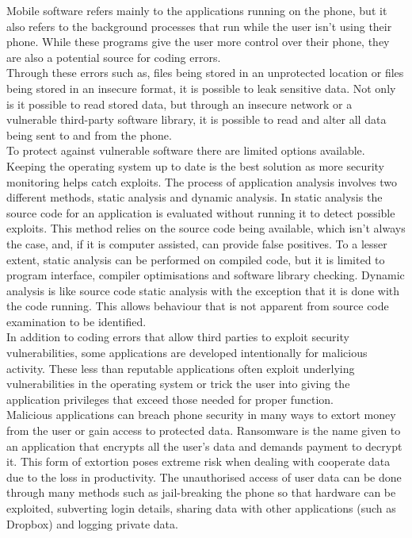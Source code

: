 Mobile software refers mainly to the applications running on the phone, but it  also refers to the background processes that run while the user isn't using their phone.
While these programs give the user more control over their phone, they are also a potential source for coding errors.\\ 
Through these errors such as, files being stored in an unprotected location or files being stored in an insecure format, it is possible to leak sensitive data.\cite{Reference14}
Not only is it possible to read stored data, but through an insecure network or a vulnerable third-party software library, it is possible to read and alter all data being sent to and from the phone.\\ 
To protect against vulnerable software there are limited options available.
Keeping the operating system up to date is the best solution as more security monitoring helps catch exploits.\cite{Reference12}
The process of application analysis involves two different methods, static analysis and dynamic analysis.
In static analysis the source code for an application is evaluated without running it to detect possible exploits.
This method relies on the source code being available, which isn’t always the case, and, if it is computer assisted, can provide false positives.\cite{Reference15}
To a lesser extent, static analysis can be performed on compiled code, but it is limited to program interface, compiler optimisations and software library checking.
Dynamic analysis is like source code static analysis with the exception that it is done with the code running.
This allows behaviour that is not apparent from source code examination to be identified.\cite{Reference13}\\
In addition to coding errors that allow third parties to exploit security vulnerabilities, some applications are developed intentionally for malicious activity.
These less than reputable applications often exploit underlying vulnerabilities in the operating system or trick the user into giving the application privileges that exceed those needed for proper function.\cite{Reference16}\\
Malicious applications can breach phone security in many ways to extort money from the user or gain access to protected data.
Ransomware is the name given to an application that encrypts all the user’s data and demands payment to decrypt it.
This form of extortion poses extreme risk when dealing with cooperate data due to the loss in productivity.
The unauthorised access of user data can be done through many methods such as jail-breaking the phone so that hardware can be exploited, subverting login details, sharing data with other applications (such as Dropbox) and logging private data.\cite{Reference13}\\
